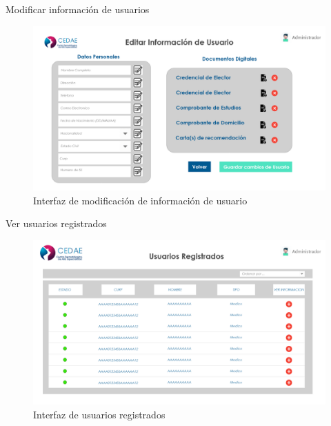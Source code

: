 \documentclass[12pt,letterpaper]{article}
\begin{document}
        Modificar información de usuarios
            \begin{figure}[H]
                \centering
                \includegraphics [scale=0.2]{adm_mod_info}
                \caption{Interfaz de modificación de información de usuario}
            \end{figure}
        Ver usuarios registrados
            \begin{figure}[H]
                \centering
                \includegraphics [scale=0.2]{adm_ver_usuario}
                \caption{Interfaz de usuarios registrados}
            \end{figure}
\end{document}

